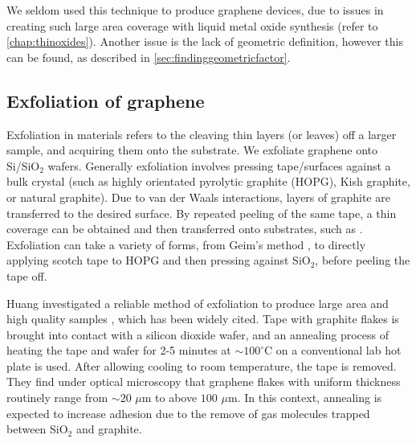 \documentclass[../../Matt_Gebert_Honours_Thesis.tex]{subfiles}
\begin{document}
	We seldom used this technique to produce graphene devices, due to issues in creating such large area coverage with liquid metal oxide synthesis (refer to \cref{chap:thinoxides}). Another issue is the lack of geometric definition, however this can be found, as described in \cref{sec:findinggeometricfactor}. %
	
	\subsection{Exfoliation of graphene}\label{sec:exfoliation}
	Exfoliation in materials refers to the cleaving thin layers (or leaves) off a larger sample, and acquiring them onto the substrate. We exfoliate graphene onto Si/SiO$_2$ wafers. 
	Generally exfoliation involves pressing tape/surfaces against a bulk crystal (such as highly orientated pyrolytic graphite (HOPG), Kish graphite, or natural graphite). Due to van der Waals interactions, layers of graphite are transferred to the desired surface. By repeated peeling of the same tape, a thin coverage can be obtained and then transferred onto substrates, such as \silicondioxide.
	Exfoliation can take a variety of forms, from Geim's method \cite{novoselov_two-dimensional_2005}, to directly applying scotch tape to HOPG and then pressing against SiO$_2$, before peeling the tape off.
	
	Huang  investigated a reliable method of exfoliation to produce large area and high quality samples \cite{huang_reliable_2015}, which has been widely cited. Tape with graphite flakes is brought into contact with a silicon dioxide wafer, and an annealing process of heating the tape and wafer for 2-5 minutes at $\sim 100^\circ$C on a conventional lab hot plate is used. After allowing cooling to room temperature, the tape is removed. They find under optical microscopy that graphene flakes with uniform thickness routinely range from $\sim 20$ $\mu$m to above $100$ $\mu$m. In this context, annealing is expected to increase adhesion due to the remove of gas molecules trapped between SiO$_2$ and graphite.\newline 
	
\end{document}
